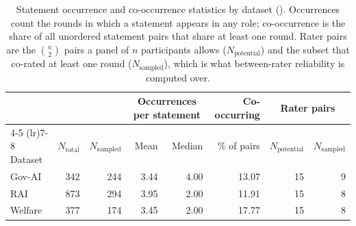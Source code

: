 \begin{table}[t]
\centering
\small
\caption{Statement occurrence and co-occurrence statistics by dataset (). Occurrences count the rounds in which a statement appears in any role; co-occurrence is the share of all unordered statement pairs that share at least one round. Rater pairs are the $\binom{n}{2}$ pairs a panel of $n$ participants allows ($N_\text{potential}$) and the subset that co-rated at least one round ($N_\text{sampled}$), which is what between-rater reliability is computed over.}
\label{tab:coverage}
\begin{tabular}{lrrrrrrr}
\toprule
 & & & \multicolumn{2}{c}{Occurrences per statement} & Co-occurring & \multicolumn{2}{c}{Rater pairs} \\
\cmidrule(lr){4-5} \cmidrule(lr){7-8}
Dataset & $N_\text{total}$ & $N_\text{sampled}$ & Mean & Median & \% of pairs & $N_\text{potential}$ & $N_\text{sampled}$ \\
\midrule
Gov-AI & 342 & 244 & 3.44 & 4.00 & 13.07 & 15 & 9 \\
RAI & 873 & 294 & 3.95 & 2.00 & 11.91 & 15 & 8 \\
Welfare & 377 & 174 & 3.45 & 2.00 & 17.77 & 15 & 8 \\
\bottomrule
\end{tabular}
\end{table}
